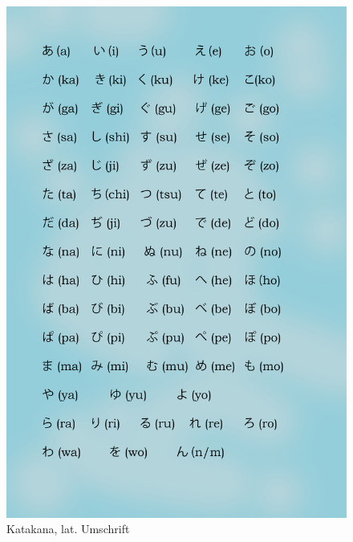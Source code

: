 \begin{frame}
\begin{minipage}{.4\textwidth}
\begin{figure}
	\includegraphics[scale=.057]{material/05Katakana}
	\caption{Katakana, lat. Umschrift}
	\label{Katakana}
\end{figure}
\end{minipage}

\end{frame}


